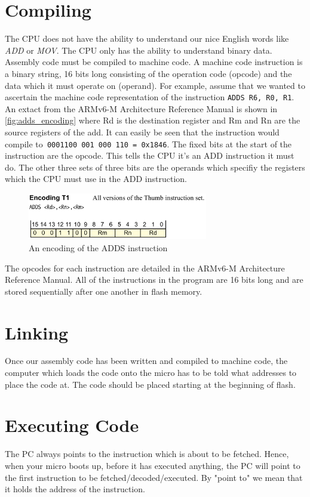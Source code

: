 \section{Compiling}
The CPU does not have the ability to understand our nice English words like \textit{ADD} or \textit{MOV}. The CPU only has the ability to understand binary data. Assembly code must be compiled to machine code. A machine code instruction is a binary string, 16 bits long consisting of the operation code (opcode) and the data which it must operate on (operand).
For example, assume that we wanted to ascertain the machine code representation of the instruction \texttt{ADDS R6, R0, R1}. An extact from the ARMv6-M Architecture Reference Manual is shown in \autoref{fig:adds_encoding} where Rd is the destination register and Rm and Rn are the source registers of the add. It can easily be seen that the instruction would compile to\texttt{ 0001100 001 000 110 = 0x1846}. The fixed bits at the start of the instruction are the opcode. This tells the CPU it's an ADD instruction it must do. The other three sets of three bits are the operands which specifiy the registers which the CPU must use in the ADD instruction. 
\begin{figure}
\centering
\includegraphics[width=0.7\textwidth]{./week1/adds_encoding}
\caption{An encoding of the ADDS instruction}
\label{fig:adds_encoding}
\end{figure}
The opcodes for each instruction are detailed in the ARMv6-M Architecture Reference Manual.
All of the instructions in the program are 16 bits long and are stored sequentially after one another in flash memory. 

\section{Linking}
Once our assembly code has been written and compiled to machine code, the computer which loads the code onto the micro has to be told what addresses to place the code at. The code should be placed starting at the beginning of flash.

\section{Executing Code}
The PC always points to the instruction which is about to be fetched. Hence, when your micro boots up, before it has executed anything, the PC will point to the first instruction to be fetched/decoded/executed. By "point to" we mean that it holds the address of the instruction. 


